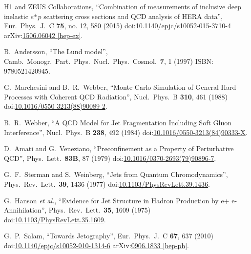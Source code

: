 \begin{thebibliography}{99}
H1 and ZEUS Collaborations, ``Combination of measurements of inclusive deep inelastic ${e^{\pm }p}$ scattering cross sections and QCD analysis of HERA data'', Eur.\ Phys.\ J.\ C {\bf 75}, no. 12, 580 (2015) doi:\href{http://dx.doi.org/10.1140/epjc/s10052-015-3710-4}{10.1140/epjc/s10052-015-3710-4} arXiv:\href{https://arxiv.org/abs/1506.06042}{1506.06042 [hep-ex]}.

B.~Andersson, ``The Lund model'', Camb.\ Monogr.\ Part.\ Phys.\ Nucl.\ Phys.\ Cosmol.\ {\bf 7}, 1 (1997) ISBN: 9780521420945. 


G.~Marchesini and B.~R.~Webber, ``Monte Carlo Simulation of General Hard Processes with Coherent QCD Radiation'', Nucl.\ Phys.\ B {\bf 310}, 461 (1988) doi:\href{http://dx.doi.org/10.1016/0550-3213(88)90089-2}{10.1016/0550-3213(88)90089-2}.

B.~R.~Webber, ``A QCD Model for Jet Fragmentation Including Soft Gluon Interference'', Nucl.\ Phys.\ B {\bf 238}, 492 (1984) doi:\href{http://dx.doi.org/10.1016/0550-3213(84)90333-X}{10.1016/0550-3213(84)90333-X}.

D.~Amati and G.~Veneziano, ``Preconfinement as a Property of Perturbative QCD'', Phys.\ Lett.\ {\bf 83B}, 87 (1979) doi:\href{http://dx.doi.org/10.1016/0370-2693(79)90896-7}{10.1016/0370-2693(79)90896-7}.

G.~F.~Sterman and S.~Weinberg, ``Jets from Quantum Chromodynamics'', Phys.\ Rev.\ Lett.\ {\bf 39}, 1436 (1977) doi:\href{http://dx.doi.org/10.1103/PhysRevLett.39.1436}{10.1103/PhysRevLett.39.1436}.

G.~Hanson {\it et al.}, ``Evidence for Jet Structure in Hadron Production by e+ e- Annihilation'', Phys.\ Rev.\ Lett.\ {\bf 35}, 1609 (1975) doi:\href{http://dx.doi.org/10.1103/PhysRevLett.35.1609}{10.1103/PhysRevLett.35.1609}.


G.~P.~Salam, ``Towards Jetography'', Eur.\ Phys.\ J.\ C {\bf 67}, 637 (2010) doi:\href{http://dx.doi.org/10.1140/epjc/s10052-010-1314-6}{10.1140/epjc/s10052-010-1314-6} arXiv:\href{http://arxiv.org/abs/arXiv:0906.1833}{0906.1833 [hep-ph]}.


\end{thebibliography}
